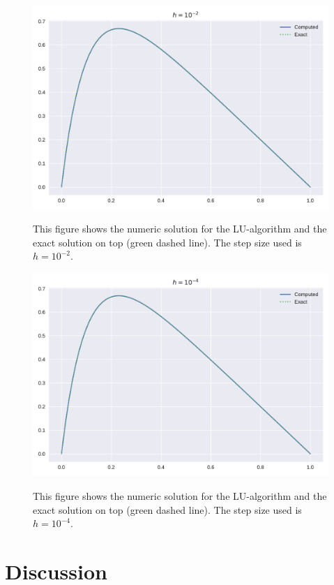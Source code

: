 \documentclass[reprint, english,notitlepage]{revtex4-1}  %
\begin{document}
\begin{figure}[h]
	\centering
	\includegraphics[scale=0.5]{../output/LU_2.pdf}
	\label{fig:lu_2}
	\caption{This figure shows the numeric solution for the LU-algorithm and the exact solution on top (green dashed line). The step size used is $h=10^{-2}$.}
\end{figure}

\begin{figure}[h]
	\centering
	\includegraphics[scale=0.5]{../output/LU_4.pdf}
	\label{fig:lu_4}
	\caption{This figure shows the numeric solution for the LU-algorithm and the exact solution on top (green dashed line). The step size used is $h=10^{-4}$.}
\end{figure}
\section{Discussion}
\end{document}
